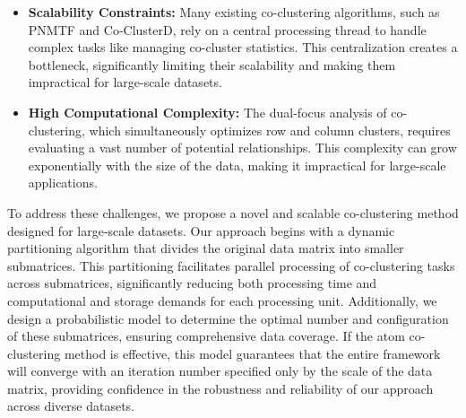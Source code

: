 \documentclass[journal]{IEEEtran}
\renewcommand{\cite}[1]{~\autocite{#1}}
\begin{document}
\begin{itemize}
  \item \textbf{Scalability Constraints:} Many existing co-clustering algorithms, such as PNMTF and Co-ClusterD, rely on a central processing thread to handle complex tasks like managing co-cluster statistics. This centralization creates a bottleneck, significantly limiting their scalability and making them impractical for large-scale datasets.
  \item \textbf{High Computational Complexity:} The dual-focus analysis of co-clustering, which simultaneously optimizes row and column clusters, requires evaluating a vast number of potential relationships. This complexity can grow exponentially with the size of the data, making it impractical for large-scale applications.
\end{itemize}


To address these challenges, we propose a novel and scalable co-clustering method designed for large-scale datasets. Our approach begins with a dynamic partitioning algorithm that divides the original data matrix into smaller submatrices. This partitioning facilitates parallel processing of co-clustering tasks across submatrices, significantly reducing both processing time and computational and storage demands for each processing unit. Additionally, we design a probabilistic model to determine the optimal number and configuration of these submatrices, ensuring comprehensive data coverage. If the atom co-clustering method is effective, this model guarantees that the entire framework will converge with an iteration number specified only by the scale of the data matrix, providing confidence in the robustness and reliability of our approach across diverse datasets.
\end{document}
